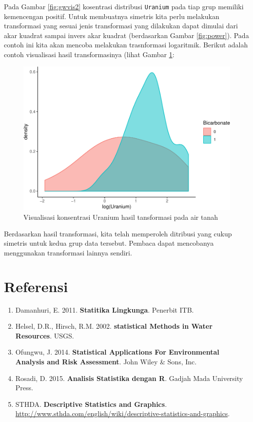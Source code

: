 \documentclass[]{book}
\providecommand{\tightlist}{%
  \setlength{\itemsep}{0pt}\setlength{\parskip}{0pt}}
\begin{document}
Pada Gambar \ref{fig:gwvis2} kosentrasi distribusi \texttt{Uranium} pada
tiap grup memiliki kemencengan positif. Untuk membuatnya simetris kita
perlu melakukan transformasi yang sesuai jenis transformasi yang
dilakukan dapat dimulai dari akar kuadrat sampai invers akar kuadrat
(berdasarkan Gambar \ref{fig:power}). Pada contoh ini kita akan mencoba
melakukan trasnformasi logaritmik. Berikut adalah contoh visualisasi
hasil transformasinya (lihat Gambar \ref{fig:urantrans}:

\begin{figure}

{\centering \includegraphics[width=0.7\linewidth]{EnvStat_files/figure-latex/urantrans-1} 

}

\caption{Visualisasi konsentrasi Uranium  hasil tansformasi pada air tanah}\label{fig:urantrans}
\end{figure}

Berdasarkan hasil transformasi, kita telah memperoleh ditribusi yang
cukup simetris untuk kedua grup data tersebut. Pembaca dapat mencobanya
menggunakan transformasi lainnya sendiri.

\section{Referensi}\label{referensi-5}

\begin{enumerate}
\def\labelenumi{\arabic{enumi}.}
\tightlist
\item
  Damanhuri, E. 2011. \textbf{Statitika Lingkunga}. Penerbit ITB.
\item
  Helsel, D.R., Hirsch, R.M. 2002. \textbf{statistical Methods in Water
  Resources}. USGS.
\item
  Ofungwu, J. 2014. \textbf{Statistical Applications For Environmental
  Analysis and Risk Assessment}. John Wiley \& Sons, Inc.
\item
  Rosadi, D. 2015. \textbf{Analisis Statistika dengan R}. Gadjah Mada
  University Press.
\item
  STHDA. \textbf{Descriptive Statistics and Graphics}.
  \url{http://www.sthda.com/english/wiki/descriptive-statistics-and-graphics}.
\end{enumerate}
\end{document}
